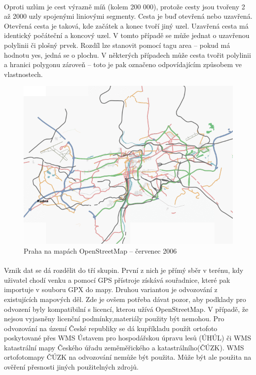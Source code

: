 \documentclass[11pt,a4paper,titlepage,oneside]{book}
\begin{document}
		\paragraph{} Oproti uzlům je cest výrazně míň (kolem 200 000), protože cesty jsou tvořeny 2 až 2000 uzly spojenými liniovými segmenty. Cesta je buď otevřená nebo uzavřená. Otevřená cesta je taková, kde začátek a konec tvoří jiný uzel. Uzavřená cesta má identický počáteční a koncový uzel. V tomto případě se může jednat o uzavřenou polylinii či plošný prvek. Rozdíl lze stanovit pomocí tagu area -- pokud má hodnotu yes, jedná se o plochu. V některých případech může cesta tvořit polylinii a hranici polygonu zároveň -- toto je pak označeno odpovídajícím způsobem ve vlastnostech.

		\begin{figure}[!h]
			\begin{center}
				\includegraphics[width=12cm]{obrazky/Osm-200607-praha.png}
				\caption{Praha na mapách OpenStreetMap -- červenec 2006}
				\label{fig:praha2006}
			\end{center}
		\end{figure}

		\paragraph{} Vznik dat se dá rozdělit do tří skupin. První z nich je přímý sběr v terénu, kdy uživatel chodí venku a pomocí GPS přístroje získává souřadnice, které pak importuje v souboru GPX do mapy. Druhou variantou je odvozování z existujících mapových děl. Zde je ovšem potřeba dávat pozor, aby podklady pro odvození  byly kompatibilní s licencí, kterou užívá OpenStreetMap. V případě, že nejsou vyjasněny licenční podmínky,materiály použity být nemohou. Pro odvozování na území České republiky se dá kupříkladu použít ortofoto poskytované přes WMS Ústavem pro hospodářskou úpravu lesů (ÚHÚL) či WMS katastrální mapy Českého úřadu zeměměřického a katastrálního(ČÚZK). WMS ortofotomapy ČÚZK na odvozování nemůže být použita. Může být ale použita na ověření přesnosti jiných použitelných zdrojů.
\end{document}
